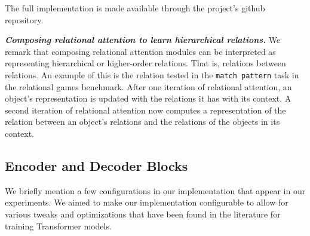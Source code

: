 The full implementation is made available through the project's github repository.


\textit{\textbf{Composing relational attention to learn hierarchical relations.}} We remark that composing relational attention modules can be interpreted as representing hierarchical or higher-order relations. That is, relations between relations. An example of this is the relation tested in the \texttt{match pattern} task in the relational games benchmark. After one iteration of relational attention, an object's representation is updated with the relations it has with its context. A second iteration of relational attention now computes a representation of the relation between an object's relations and the relations of the objects in its context.

\subsection{Encoder and Decoder Blocks}


We briefly mention a few configurations in our implementation that appear in our experiments. We aimed to make our implementation configurable to allow for various tweaks and optimizations that have been found in the literature for training Transformer models.


